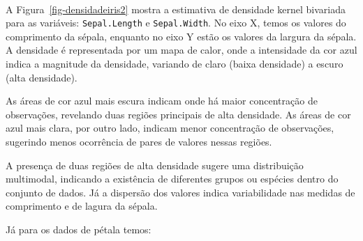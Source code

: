 \documentclass[
  a4paperpaper,
]{article}
\newenvironment{Shaded}{\begin{snugshade}}{\end{snugshade}}
\newcommand{\AttributeTok}[1]{\textcolor[rgb]{0.40,0.45,0.13}{#1}}
\newcommand{\CommentTok}[1]{\textcolor[rgb]{0.37,0.37,0.37}{#1}}
\newcommand{\ConstantTok}[1]{\textcolor[rgb]{0.56,0.35,0.01}{#1}}
\newcommand{\DecValTok}[1]{\textcolor[rgb]{0.68,0.00,0.00}{#1}}
\newcommand{\DocumentationTok}[1]{\textcolor[rgb]{0.37,0.37,0.37}{\textit{#1}}}
\newcommand{\FunctionTok}[1]{\textcolor[rgb]{0.28,0.35,0.67}{#1}}
\newcommand{\NormalTok}[1]{\textcolor[rgb]{0.00,0.23,0.31}{#1}}
\newcommand{\OtherTok}[1]{\textcolor[rgb]{0.00,0.23,0.31}{#1}}
\newcommand{\SpecialCharTok}[1]{\textcolor[rgb]{0.37,0.37,0.37}{#1}}
\newcommand{\StringTok}[1]{\textcolor[rgb]{0.13,0.47,0.30}{#1}}
\begin{document}
~

A Figura~\ref{fig-densidadeiris2} mostra a estimativa de densidade
kernel bivariada para as variáveis: \texttt{Sepal.Length} e
\texttt{Sepal.Width}. No eixo X, temos os valores do comprimento da
sépala, enquanto no eixo Y estão os valores da largura da sépala. A
densidade é representada por um mapa de calor, onde a intensidade da cor
azul indica a magnitude da densidade, variando de claro (baixa
densidade) a escuro (alta densidade).

As áreas de cor azul mais escura indicam onde há maior concentração de
observações, revelando duas regiões principais de alta densidade. As
áreas de cor azul mais clara, por outro lado, indicam menor concentração
de observações, sugerindo menos ocorrência de pares de valores nessas
regiões.

A presença de duas regiões de alta densidade sugere uma distribuição
multimodal, indicando a existência de diferentes grupos ou espécies
dentro do conjunto de dados. Já a dispersão dos valores indica
variabilidade nas medidas de comprimento e de lagura da sépala.

Já para os dados de pétala temos:

~

\begin{Shaded}
\end{Shaded}
\end{document}
